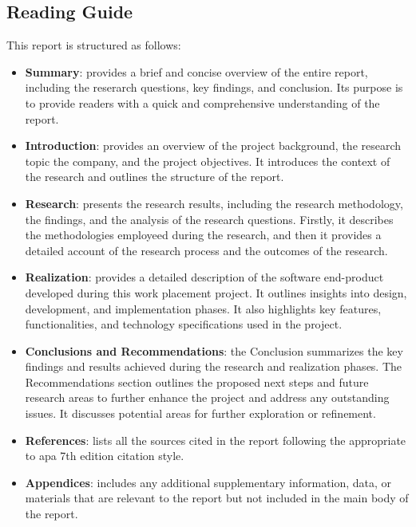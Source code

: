 \begin{multicols}{2}
      \section{Reading Guide}
      This report is structured as follows:
      \begin{itemize}
            \item \textbf{Summary}: provides a brief and concise overview of the entire report, including the reserarch questions,
                  key findings, and conclusion. Its purpose is to provide readers with a quick and comprehensive understanding of the
                  report.
            \item \textbf{Introduction}: provides an overview of the project background, the research topic the company, and the
                  project objectives. It introduces the context of the research and outlines the structure of the report.
            \item \textbf{Research}: presents the research results, including the research methodology, the findings, and the
                  analysis of the research questions. Firstly, it describes the methodologies employeed during the research, and then
                  it provides a detailed account of the research process and the outcomes of the research.
            \item \textbf{Realization}: provides a detailed description of the software end-product developed during this work placement
                  project. It outlines insights into design, development, and implementation phases. It also highlights key features,
                  functionalities, and technology specifications used in the project.
            \item \textbf{Conclusions and Recommendations}: the Conclusion summarizes the key findings and results achieved during
                  the research and realization phases. The Recommendations section outlines the proposed next steps and future research
                  areas to further enhance the project and address any outstanding issues. It discusses potential areas for further
                  exploration or refinement.
            \item \textbf{References}: lists all the sources cited in the report following the appropriate to \acrshort{apa} 7th edition
                  citation style.
            \item \textbf{Appendices}: includes any additional supplementary information, data, or materials that are relevant to the
                  report but not included in the main body of the report.
      \end{itemize}
\end{multicols}